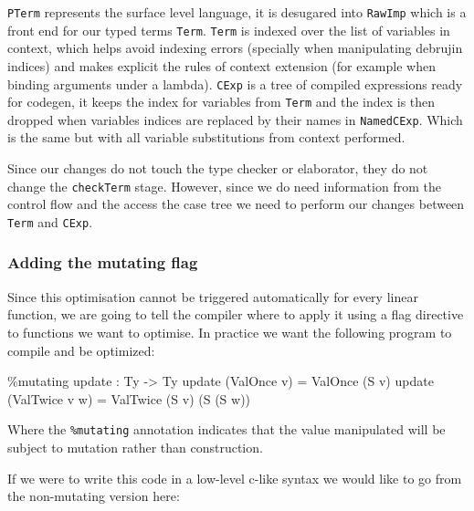 \documentclass[
]{article}
\newenvironment{Shaded}{}{}
\newcommand{\DataTypeTok}[1]{\textcolor[rgb]{0.56,0.13,0.00}{#1}}
\newcommand{\NormalTok}[1]{#1}
\newcommand{\OperatorTok}[1]{\textcolor[rgb]{0.40,0.40,0.40}{#1}}
\newcommand{\OtherTok}[1]{\textcolor[rgb]{0.00,0.44,0.13}{#1}}
\begin{document}
\texttt{PTerm} represents the surface level language, it is desugared
into \texttt{RawImp} which is a front end for our typed terms
\texttt{Term}. \texttt{Term} is indexed over the list of variables in
context, which helps avoid indexing errors (specially when manipulating
debrujin indices) and makes explicit the rules of context extension (for
example when binding arguments under a lambda). \texttt{CExp} is a tree
of compiled expressions ready for codegen, it keeps the index for
variables from \texttt{Term} and the index is then dropped when
variables indices are replaced by their names in \texttt{NamedCExp}.
Which is the same but with all variable substitutions from context
performed.

Since our changes do not touch the type checker or elaborator, they do
not change the \texttt{checkTerm} stage. However, since we do need
information from the control flow and the access the case tree we need
to perform our changes between \texttt{Term} and \texttt{CExp}.

\hypertarget{adding-the-mutating-flag}{%
\subsubsection{Adding the mutating
flag}\label{adding-the-mutating-flag}}

Since this optimisation cannot be triggered automatically for every
linear function, we are going to tell the compiler where to apply it
using a flag directive to functions we want to optimise. In practice we
want the following program to compile and be optimized:

\begin{Shaded}
\begin{Highlighting}[]
\OperatorTok{\%}\NormalTok{mutating}
\NormalTok{update }\OperatorTok{:} \DataTypeTok{Ty} \OtherTok{{-}\textgreater{}} \DataTypeTok{Ty}
\NormalTok{update (}\DataTypeTok{ValOnce}\NormalTok{ v) }\OtherTok{=} \DataTypeTok{ValOnce}\NormalTok{ (}\DataTypeTok{S}\NormalTok{ v)}
\NormalTok{update (}\DataTypeTok{ValTwice}\NormalTok{ v w) }\OtherTok{=} \DataTypeTok{ValTwice}\NormalTok{ (}\DataTypeTok{S}\NormalTok{ v) (}\DataTypeTok{S}\NormalTok{ (}\DataTypeTok{S}\NormalTok{ w))}
\end{Highlighting}
\end{Shaded}

Where the \texttt{\%mutating} annotation indicates that the value
manipulated will be subject to mutation rather than construction.

If we were to write this code in a low-level c-like syntax we would like
to go from the non-mutating version here:
\end{document}
